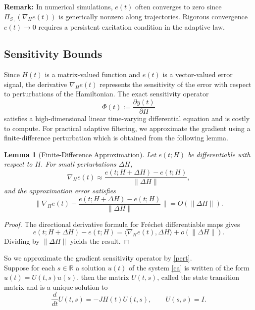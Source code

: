 \documentclass[reqno]{amsart}
\numberwithin{equation}{section}
\newcommand{\R}{\mathbb{R}}
\newtheorem{lemma}[theorem]{Lemma}
\begin{document}
\textbf{Remark:}  In numerical simulations, $e(t)$ often converges to zero since $\Pi_{S_+}(\nabla_H e(t))$ is generically nonzero along trajectories. Rigorous convergence $e(t) \to 0$ requires a persistent excitation condition  in the adaptive law.


\subsection{Sensitivity Bounds}



Since $H(t)$ is a matrix-valued function and $e(t)$ is a vector-valued error signal, the derivative $\nabla_H e(t)$ represents the sensitivity of the error with respect to perturbations of the Hamiltonian. The exact sensitivity operator
\begin{equation}\label{so}
\Phi(t) := \frac{\partial y(t)}{\partial H}
\end{equation}
satisfies a high-dimensional linear time-varying differential equation
and is costly to compute. 
For practical adaptive filtering, we approximate the gradient using a finite-difference perturbation which is obtained from the following lemma.
\begin{lemma}[Finite-Difference Approximation]\label{lem:FD}
Let $e(t;H)$ be differentiable with respect to $H$.  
For small perturbations $\Delta H$,
\begin{equation} \label{pert}
    \nabla_H e(t)
    \approx \frac{e(t;H+\Delta H)-e(t;H)}{\|\Delta H\|},
\end{equation}
and the approximation error satisfies
\[
    \Bigg\|
        \nabla_H e(t)
        -
        \frac{e(t;H+\Delta H)-e(t;H)}{\|\Delta H\|}
    \Bigg\|
    = O(\|\Delta H\|).
\]
\end{lemma}

\begin{proof}
The directional derivative formula for Fr\'echet differentiable maps gives
\[
    e(t;H+\Delta H)-e(t;H)
    = \langle \nabla_H e(t), \Delta H \rangle + o(\|\Delta H\|).
\]
Dividing by $\|\Delta H\|$ yields the result.
\end{proof}
So we approximate the gradient  sensitivity operator by \eqref{pert}.\\

Suppose for each $s\in \R$ a solution $u(t)$ of the system \eqref{ca} is written of the form $ u(t)= U(t,s) u(s)$. then the matrix $ U(t,s)$, called the state transition matrix and is a unique solution to  
\begin{equation} \label{fm}
\frac{d}{dt}U(t,s)=-JH(t)U(t,s), \qquad U(s,s)=I.  
\end{equation}
\end{document}
